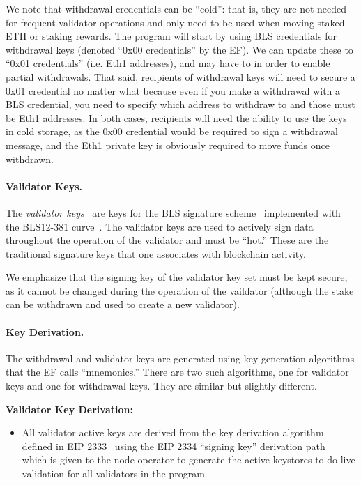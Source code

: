 We note that withdrawal credentials can be ``cold'':  that is, they are not needed for frequent validator operations and only need to be used when moving staked ETH or staking rewards.  The program will start by using BLS credentials for withdrawal keys (denoted ``0x00 credentials'' by the EF). We can update these to ``0x01 credentials'' (i.e. Eth1 addresses), and may have to in order to enable partial withdrawals. That said, recipients of withdrawal keys will need to secure a 0x01 credential no matter what because even if you make a withdrawal with a BLS credential, you need to specify which address to withdraw to and those must be Eth1 addresses. In both cases, recipients will need the ability to use the keys in cold storage, as the 0x00 credential would be required to sign a withdrawal message, and the Eth1 private key is obviously required to move funds once withdrawn. 

\paragraph{Validator Keys.}  The \emph{validator keys}~\cite{EthVal} are keys for the BLS signature scheme~\cite{AC:BonLynSha01} implemented with the BLS12-381 curve~\cite{BLS12-318}.  The validator keys are used to actively sign data throughout the operation of the validator and must be ``hot.'' These are the traditional signature keys that one associates with blockchain activity.

We emphasize that the signing key of the validator key set must be kept secure, as it cannot be changed during the operation of the vaildator (although the stake can be withdrawn and used to create a new validator).

\paragraph{Key Derivation.}  The withdrawal and validator keys are generated using key generation algorithms that the EF calls ``mnemonics.'' There are two such algorithms, one for validator keys and one for withdrawal keys. They are similar but slightly different.

\medskip

\textbf{Validator Key Derivation:}
\begin{itemize}
 \item All validator active keys are derived from the key derivation algorithm defined in EIP 2333~\cite{EthBLSKeyGen} using the EIP 2334 ``signing key'' derivation path~\cite{EthBLSHierarchy} which is
given to the node operator to generate the active keystores to do live validation for all validators in the program.
\end{itemize}


